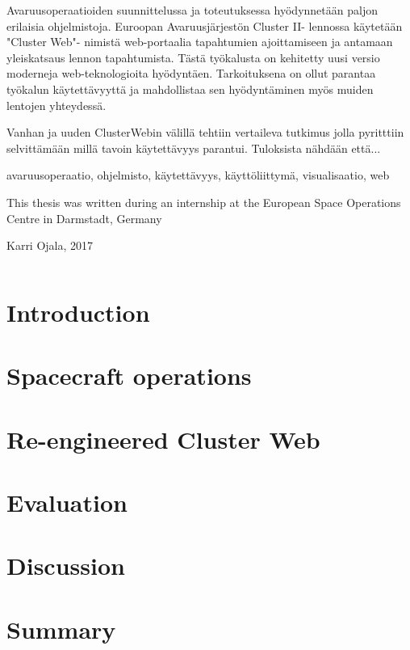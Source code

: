 \documentclass[a4paper, 12pt,titlepage]{dithesis}
\begin{document}
\begin{tiivistelma}
Avaruusoperaatioiden suunnittelussa ja toteutuksessa hyödynnetään paljon erilaisia ohjelmistoja. Euroopan Avaruusjärjestön Cluster II- lennossa käytetään "Cluster Web"- nimistä web-portaalia tapahtumien ajoittamiseen ja antamaan yleiskatsaus lennon tapahtumista. Tästä työkalusta on kehitetty uusi versio moderneja web-teknologioita hyödyntäen. Tarkoituksena on ollut parantaa työkalun käytettävyyttä ja mahdollistaa sen hyödyntäminen myös muiden lentojen yhteydessä.

Vanhan ja uuden ClusterWebin välillä tehtiin vertaileva tutkimus jolla pyritttiin selvittämään millä tavoin käytettävyys parantui. Tuloksista nähdään että...

\avainsanat avaruusoperaatio, ohjelmisto, käytettävyys, käyttöliittymä, visualisaatio, web
\end{tiivistelma}


\sisluettelo

This thesis was written during an internship at the European Space Operations Centre in Darmstadt, Germany

Karri Ojala, 2017


\setlongtables
\begin{longtable}[l]{p{3cm}p{}}



\end{longtable}
\setcounter{table}{0}

\chapter{Introduction}
\sivunumerot

\chapter{Spacecraft operations}

\chapter{Re-engineered Cluster Web}

\chapter{Evaluation}

\chapter{Discussion}

\chapter{Summary}



\end{document}
